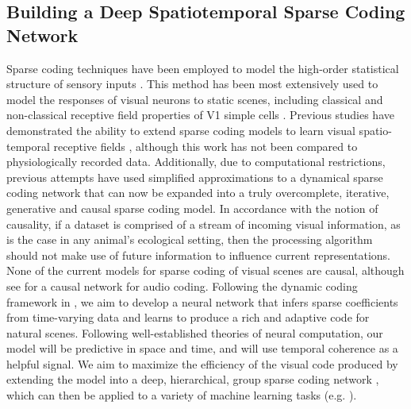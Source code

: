 \documentclass[smallextended]{svjour3}       %
\begin{document}
\subsection{Building a Deep Spatiotemporal Sparse Coding Network}
\noindent Sparse coding techniques have been employed to model the high-order statistical structure of sensory inputs \cite{simoncelli2001natural}. This method has been most extensively used to model the responses of visual neurons to static scenes, including classical and non-classical receptive field properties of V1 simple cells \cite{olshausen1996emergence,rehn2007network,zhu2013visual,zylberberg2011sparse}. Previous studies have demonstrated the ability to extend sparse coding models to learn visual spatio-temporal receptive fields \cite{dean2009recursive,olshausen2003learning,haterenhansruderman1998independent,hyvarinen2003bubbles}, although this work has not been compared to physiologically recorded data. Additionally, due to computational restrictions, previous attempts have used simplified approximations to a dynamical sparse coding network that can now be expanded into a truly overcomplete, iterative, generative and causal sparse coding model. In accordance with the notion of causality, if a dataset is comprised of a stream of incoming visual information, as is the case in any animal's ecological setting, then the processing algorithm should not make use of future information to influence current representations. None of the current models for sparse coding of visual scenes are causal, although see \cite{charles2011causal} for a causal network for audio coding. Following the dynamic coding framework in \cite{rozell2008sparse}, we aim to develop a neural network that infers sparse coefficients from time-varying data and learns to produce a rich and adaptive code for natural scenes. Following well-established theories of neural computation, our model will be predictive \cite{rao1999predictive} in space and time, and will use temporal coherence \cite{hyvarinen2003bubbles} as a helpful signal. We aim to maximize the efficiency of the visual code produced by extending the model into a deep, hierarchical, group sparse coding network \cite{paiton2015deconvolutional,cadieu2008learning,le2013building}, which can then be applied to a variety of machine learning tasks (e.g. \cite{dean2009recursive,porikli2010compressed,shan2005cross}).
\end{document}
